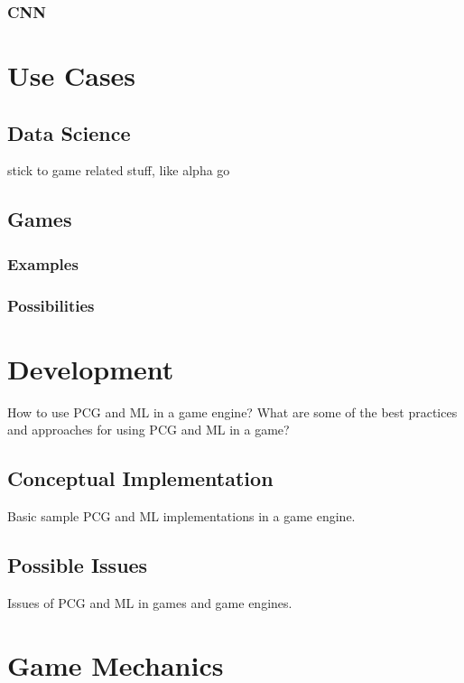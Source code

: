 \documentclass[MGS,Master,english]{twbook}%
\begin{document}
\subsubsection{\acl{CNN}}

\section{Use Cases}
\subsection{Data Science}
stick to game related stuff, like alpha go
\subsection{Games}
\subsubsection{Examples}
\subsubsection{Possibilities}

\section{Development}
How to use PCG and ML in a game engine? What are some of the best practices and approaches for using PCG and ML in a game?

\subsection{Conceptual Implementation}
Basic sample PCG and ML implementations in a game engine.

\subsection{Possible Issues}
Issues of PCG and ML in games and game engines.


\section{Game Mechanics}
\end{document}
